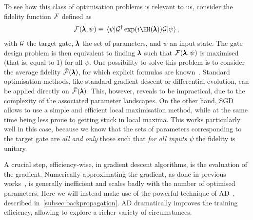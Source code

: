 To see how this class of optimisation problems is relevant to us, consider the fidelity function $\mathcal{F}$ defined as
\begin{equation}
	\calF(\bs\lambda, \psi) \equiv \mel{\psi}{\calG^\dagger \exp(i \HH(\bs\lambda)) \calG}{\psi},
	\label{eq:def_fidelity}
\end{equation}
with $\mathcal{G}$ the target gate, $\pmb{\lambda}$ the set of parameters, and $\psi$ an input state.
The gate design problem is then equivalent to finding $\pmb{\lambda}$ such that $\mathcal{F}(\pmb{\lambda}, \psi)$ is maximised (that is, equal to 1) for all $\psi$.
One possibility to solve this problem is to consider the average fidelity $\bar{\mathcal{F}}(\pmb{\lambda})$, for which explicit formulas are known~\cite{banchi2011nonperturbative,pedersen2007fidelity,magesan2011gate}.
Standard optimisation methods, like standard gradient descent or differential evolution, can be applied directly on $\bar{\mathcal{F}}(\pmb{\lambda})$.
This, however, reveals to be impractical, due to the complexity of the associated parameter landscapes.
On the other hand, \ac{SGD} allows to use a simple and efficient local maximisation method, while at the same time being less prone to getting stuck in local maxima.
This works particularly well in this case, because we know that the sets of parameters corresponding to the target gate are \emph{all and only} those such that \emph{for all inputs $\psi$} the fidelity is unitary.

A crucial step, efficiency-wise, in gradient descent algorithms, is the evaluation of the gradient.
Numerically approximating the gradient, as done in previous works~\cite{banchi2016quantum}, is generally inefficient and scales badly with the number of optimised parameters.
Here we will instead make use of the powerful technique of \acf{AD}~\cite{bartholomewbiggs2000automatic,bischof2008advances}, described in~\cref{subsec:backpropagation}.
\ac{AD} dramatically improves the training efficiency, allowing to explore a richer variety of circumstances.



